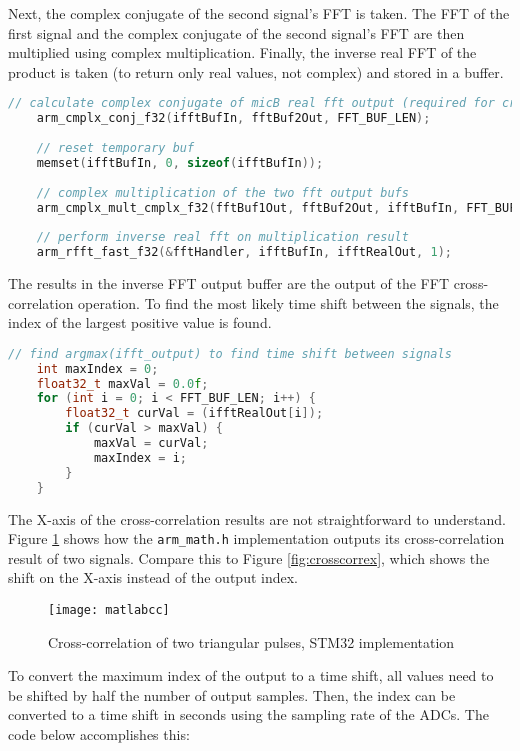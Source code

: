 \documentclass[11pt]{ucthesisCP}
\begin{document}
Next, the complex conjugate of the second signal’s FFT is taken. The FFT of the first signal and the complex conjugate of the second signal’s FFT are then multiplied using complex multiplication. Finally, the inverse real FFT of the product is taken (to return only real values, not complex) and stored in a buffer.

\begin{lstlisting}[language=C++]
	// calculate complex conjugate of micB real fft output (required for cross-correlation)
	arm_cmplx_conj_f32(ifftBufIn, fftBuf2Out, FFT_BUF_LEN);
	
	// reset temporary buf
	memset(ifftBufIn, 0, sizeof(ifftBufIn));
	
	// complex multiplication of the two fft output bufs
	arm_cmplx_mult_cmplx_f32(fftBuf1Out, fftBuf2Out, ifftBufIn, FFT_BUF_LEN);
	
	// perform inverse real fft on multiplication result
	arm_rfft_fast_f32(&fftHandler, ifftBufIn, ifftRealOut, 1);
\end{lstlisting}

The results in the inverse FFT output buffer are the output of the FFT cross-correlation operation. To find the most likely time shift between the signals, the index of the largest positive value is found.

\begin{lstlisting}[language=C++]
	// find argmax(ifft_output) to find time shift between signals
	int maxIndex = 0;
	float32_t maxVal = 0.0f;
	for (int i = 0; i < FFT_BUF_LEN; i++) {
		float32_t curVal = (ifftRealOut[i]);
		if (curVal > maxVal) {
			maxVal = curVal;
			maxIndex = i;
		}
	}
\end{lstlisting}

The X-axis of the cross-correlation results are not straightforward to understand. Figure \ref{fig:matlabcc} shows how the \verb|arm_math.h| implementation outputs its cross-correlation result of two signals. Compare this to Figure \ref{fig:crosscorrex}, which shows the shift on the X-axis instead of the output index.

\begin{figure}[htbp]
	\centering
	\texttt{[image: matlabcc]}
	\caption{Cross-correlation of two triangular pulses, STM32 implementation}
	\label{fig:matlabcc}
\end{figure}

To convert the maximum index of the output to a time shift, all values need to be shifted by half the number of output samples. Then, the index can be converted to a time shift in seconds using the sampling rate of the ADCs. The code below accomplishes this:
\end{document}
